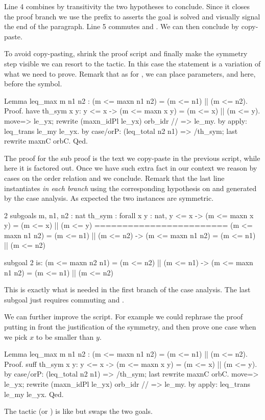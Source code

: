 Line 4 combines by transitivity the two hypotheses to conclude.  Since it closes the
proof branch we use the prefix  to asserts the goal is solved and
visually signal the end of the paragraph.  Line 5 commutes  and \C{||}.
We can then conclude by copy-paste.


To avoid copy-pasting, shrink the proof script and finally make the
symmetry step visible we can resort to the  tactic.
In this case the statement is a variation of what we need to prove.
Remark that as for , we can place parameters,  and 
here, before the \C{:} symbol.

\begin{coq}{}{}
Lemma leq_max m n1 n2 : (m <= maxn n1 n2) = (m <= n1) || (m <= n2).
Proof.
have th_sym x y: y <= x -> (m <= maxn x y) = (m <= x) || (m <= y).
  move=> le_yx; rewrite (maxn_idPl le_yx) orb_idr // => le_my.
  by apply: leq_trans le_my le_yx.
by case/orP: (leq_total n2 n1) => /th_sym; last rewrite maxnC orbC.
Qed.
\end{coq}

The proof for the  sub proof is the text we copy-paste in the
previous script, while here it is factored out.
Once we have such extra fact in our context we reason by cases on
the order relation and we conclude.  Remark that the last line instantiates
 \emph{in each branch} using the corresponding
hypothesis on  and  generated by the case analysis.
As expected the two instances are symmetric.

\begin{coqout}{}{}
2 subgoals
m, n1, n2 : nat
th_sym : forall x y : nat,
         y <= x -> (m <= maxn x y) = (m <= x) || (m <= y)
========================
(m <= maxn n1 n2) = (m <= n1) || (m <= n2) ->
(m <= maxn n1 n2) = (m <= n1) || (m <= n2)

subgoal 2 is:
(m <= maxn n2 n1) = (m <= n2) || (m <= n1) ->
(m <= maxn n1 n2) = (m <= n1) || (m <= n2)
\end{coqout}
This is exactly what is needed in the first branch of the case analysis.
The last subgoal just requires commuting  and \C{||}.

We can further improve the script.  For example we could rephrase
the proof putting in front the justification of the symmetry, and
then prove one case when we pick $x$ to be smaller than $y$.

\begin{coq}{}{}
Lemma leq_max m n1 n2 : (m <= maxn n1 n2) = (m <= n1) || (m <= n2).
Proof.
suff th_sym x y: y <= x -> (m <= maxn x y) = (m <= x) || (m <= y).
  by case/orP: (leq_total n2 n1) => /th_sym; last rewrite maxnC orbC.
move=> le_yx; rewrite (maxn_idPl le_yx) orb_idr // => le_my.
by apply: leq_trans le_my le_yx.
Qed.
\end{coq}
The  tactic (or )
is like  but swaps the two goals.

